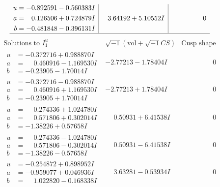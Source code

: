 \documentclass[1p]{elsarticle_modified}
\theoremstyle{definition}
\newcommand{\I}{\sqrt{-1}}
\begin{document}
$$\begin{array}{c|c|c}
\begin{aligned}
u &= -0.892591 - 0.560383 I \\
a &= \phantom{-}0.126506 + 0.724879 I \\
b &= -0.481848 - 0.396131 I\end{aligned}
 & \phantom{-}3.64192 + 5.10552 I & \phantom{-0.000000 } 0\\
 \hline 
 \end{array}$$\newpage$$\begin{array}{c|c|c}  
\text{Solutions to }I^u_{1}& \I (\text{vol} + \sqrt{-1}CS) & \text{Cusp shape}\\
 \hline 
\begin{aligned}
u &= -0.372716 + 0.988870 I \\
a &= \phantom{-}0.460916 - 1.169530 I \\
b &= -0.23905 - 1.70014 I\end{aligned}
 & -2.77213 - 1.78404 I & \phantom{-0.000000 } 0 \\ \hline\begin{aligned}
u &= -0.372716 - 0.988870 I \\
a &= \phantom{-}0.460916 + 1.169530 I \\
b &= -0.23905 + 1.70014 I\end{aligned}
 & -2.77213 + 1.78404 I & \phantom{-0.000000 } 0 \\ \hline\begin{aligned}
u &= \phantom{-}0.274336 + 1.024780 I \\
a &= \phantom{-}0.571806 + 0.302014 I \\
b &= -1.38226 + 0.57658 I\end{aligned}
 & \phantom{-}0.50931 + 6.41538 I & \phantom{-0.000000 } 0 \\ \hline\begin{aligned}
u &= \phantom{-}0.274336 - 1.024780 I \\
a &= \phantom{-}0.571806 - 0.302014 I \\
b &= -1.38226 - 0.57658 I\end{aligned}
 & \phantom{-}0.50931 - 6.41538 I & \phantom{-0.000000 } 0 \\ \hline\begin{aligned}
u &= -0.254872 + 0.898952 I \\
a &= -0.959077 + 0.046936 I \\
b &= \phantom{-}1.022820 - 0.168338 I\end{aligned}
 & \phantom{-}3.63281 - 0.53934 I & \phantom{-0.000000 } 0 \\ \hline\begin{aligned}

\end{aligned}
\end{array}$$
\end{document}

